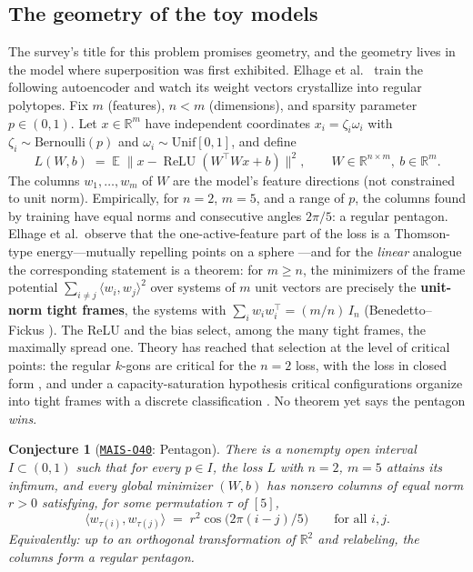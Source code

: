 \documentclass[11pt]{amsart}
\newcommand{\Oid}[1]{\href{https://github.com/lionellevine/MAIS/blob/main/open-problems/MAIS-O#1.md}{\texttt{MAIS-O#1}}}
\theoremstyle{plain}
\newtheorem{conjecture}[theorem]{Conjecture}
\theoremstyle{definition}
\newcommand{\R}{\mathbb{R}}
\newcommand{\E}{\mathbb{E}}
\DeclareMathOperator{\relu}{ReLU}
\begin{document}
\subsection{The geometry of the toy models}

The survey's title for this problem promises geometry, and the geometry lives in the model where superposition was first exhibited. Elhage et al.~\cite{elhage2022} train the following autoencoder and watch its weight vectors crystallize into regular polytopes. Fix $m$ (features), $n<m$ (dimensions), and sparsity parameter $p\in(0,1)$. Let $x\in\R^m$ have independent coordinates $x_i=\zeta_i\omega_i$ with $\zeta_i\sim\mathrm{Bernoulli}(p)$ and $\omega_i\sim\mathrm{Unif}[0,1]$, and define
\[
  L(W,b)\;=\;\E\;\bigl\lVert x-\relu(W^{\!\top}W x+b)\bigr\rVert^2,
  \qquad W\in\R^{n\times m},\ b\in\R^m .
\]
The columns $w_1,\dots,w_m$ of $W$ are the model's feature directions (not constrained to unit norm). Empirically, for $n=2$, $m=5$, and a range of $p$, the columns found by training have equal norms and consecutive angles $2\pi/5$: a regular pentagon. Elhage et al.\ observe that the one-active-feature part of the loss is a Thomson-type energy---mutually repelling points on a sphere \cite{saff1997}---and for the \emph{linear} analogue the corresponding statement is a theorem: for $m\ge n$, the minimizers of the frame potential $\sum_{i\neq j}\langle w_i,w_j\rangle^2$ over systems of $m$ unit vectors are precisely the \textbf{unit-norm tight frames}, the systems with $\sum_i w_iw_i^{\!\top}=(m/n)\,I_n$ (Benedetto--Fickus \cite{benedetto2003}). The ReLU and the bias select, among the many tight frames, the maximally spread one. Theory has reached that selection at the level of critical points: the regular $k$-gons are critical for the $n=2$ loss, with the loss in closed form \cite{chen2023}, and under a capacity-saturation hypothesis critical configurations organize into tight frames with a discrete classification \cite{ivanov2026}. No theorem yet says the pentagon \emph{wins}.

\begin{conjecture}[\Oid{40}: Pentagon]\label{conj:pentagon}
There is a nonempty open interval $I\subset(0,1)$ such that for every $p\in I$, the loss $L$ with $n=2$, $m=5$ attains its infimum, and every global minimizer $(W,b)$ has nonzero columns of equal norm $r>0$ satisfying, for some permutation $\tau$ of $[5]$,
\[
  \langle w_{\tau(i)},w_{\tau(j)}\rangle\;=\;r^2\cos\bigl(2\pi(i-j)/5\bigr)
  \qquad\text{for all } i,j .
\]
Equivalently: up to an orthogonal transformation of $\R^2$ and relabeling, the columns form a regular pentagon.
\end{conjecture}
\end{document}
